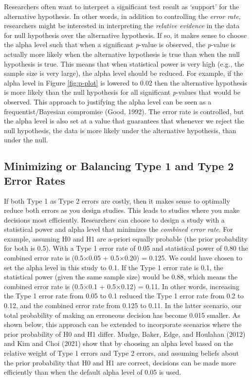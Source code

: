 \documentclass[
  english,
  ,jou, a4paper,floatsintext]{apa6}
\begin{document}
Researchers often want to interpret a significant test result as `support' for the alternative hypothesis. In other words, in addition to controlling the \emph{error rate}, researchers might be interested in interpreting the \emph{relative evidence} in the data for null hypothesis over the alternative hypothesis. If so, it makes sense to choose the alpha level such that when a significant \emph{p}-value is observed, the \emph{p}-value is actually more likely when the alternative hypothesis is true than when the null hypothesis is true. This means that when statistical power is very high (e.g., the sample size is very large), the alpha level should be reduced. For example, if the alpha level in Figure \ref{fig:p-plot} is lowered to 0.02 then the alternative hypothesis is more likely than the null hypothesis for all significant \emph{p}-values that would be observed. This approach to justifying the alpha level can be seen as a frequentist/Bayesian compromise (Good, 1992). The error rate is controlled, but the alpha level is also set at a value that guarantees that whenever we reject the null hypothesis, the data is more likely under the alternative hypothesis, than under the null.

\hypertarget{minimizing-or-balancing-type-1-and-type-2-error-rates}{%
\subsection{Minimizing or Balancing Type 1 and Type 2 Error Rates}\label{minimizing-or-balancing-type-1-and-type-2-error-rates}}

If both Type 1 as Type 2 errors are costly, then it makes sense to optimally reduce both errors as you design studies. This leads to studies where you make decisions most efficiently. Researchers can choose to design a study with a statistical power and alpha level that minimizes the \emph{combined error rate}. For example, assuming H0 and H1 are a-priori equally probable (the prior probability for both is 0.5). With a Type 1 error rate of 0.05 and statistical power of 0.80 the combined error rate is (0.5×0.05 + 0.5×0.20) = 0.125. We could have chosen to set the alpha level in this study to 0.1. If the Type 1 error rate is 0.1, the statistical power (given the same sample size) would be 0.88, which means the combined error rate is (0.5×0.1 + 0.5×0.12) = 0.11. In other words, increasing the Type 1 error rate from 0.05 to 0.1 reduced the Type 1 error rate from 0.2 to 0.12, and the combined error rate from 0.125 to 0.11. In the latter scenario, our total probability of making an erroneous decision has become 0.015 smaller. As shown below, this approach can be extended to incorporate scenarios where the prior probability of H0 and H1 differ. Mudge, Baker, Edge, and Houlahan (2012) and Kim and Choi (2021) show that by choosing an alpha level based on the relative weight of Type 1 errors and Type 2 errors, and assuming beliefs about the prior probability that H0 and H1 are correct, decisions can be made more efficiently than when the default alpha level of 0.05 is used.
\end{document}
